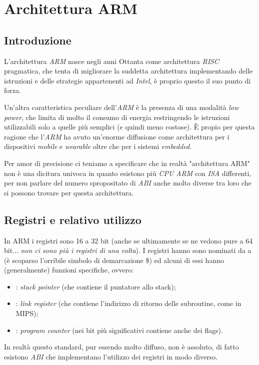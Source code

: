 \documentclass[class=book, crop=false, oneside]{standalone}
\begin{document}
\chapter{Architettura ARM}

\section{Introduzione}
L'architettura \emph{ARM} nasce negli anni Ottanta come architettura \emph{RISC} pragmatica, che tenta di migliorare la suddetta architettura implementando delle istruzioni e delle strategie appartenenti ad \emph{Intel}, è proprio questo il suo punto di forza.

Un'altra caratteristica peculiare dell'\emph{ARM} è la presenza di una modalità \emph{low power}, che limita di molto il consumo di energia restringendo le istruzioni utilizzabili solo a quelle più semplici (e quindi meno costose). È propio per questa ragione che l'\emph{ARM} ha avuto un'enorme diffusione come architettura per i dispositivi \emph{mobile} e \emph{wearable} oltre che per i sistemi \emph{embedded}.

Per amor di precisione ci teniamo a specificare che in realtà "architettura ARM" non è una dicitura univoca in quanto esistono più \emph{CPU} \emph{ARM} con \emph{ISA} differenti, per non parlare del numero spropositato di \emph{ABI} anche molto diverse tra loro che si possono trovare per questa architettura.

\section{Registri e relativo utilizzo}
In ARM i registri sono 16 a 32 bit (anche se ultimamente se ne vedono pure a 64 bit... \emph{non ci sono più i registri di una volta}). I registri hanno sono nominati da  a  (è scoparso l'orribile simbolo di demarcazione \$) ed alcuni di essi hanno (generalmente) funzioni specifiche, ovvero:

\begin{itemize}
	\item {}: \emph{stack pointer} (che contiene il puntatore allo stack);
	\item {}: \emph{link register} (che contiene l'indirizzo di ritorno delle subroutine, come  in MIPS);
	\item {}: \emph{program counter} (nei bit più significativi contiene anche dei flags).
\end{itemize}
In realtà questo standard, pur essendo molto diffuso, non è assoluto, di fatto esistono \emph{ABI} che implementano l'utilizzo dei registri in modo diverso.
\end{document}
